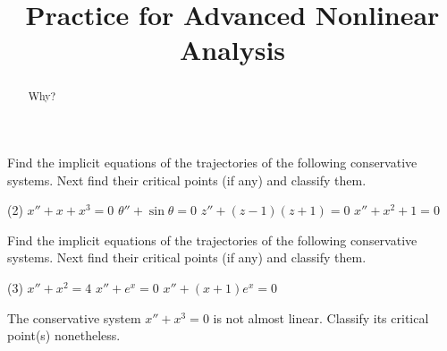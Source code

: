 \documentclass{ximera}
\title{Practice for Advanced Nonlinear Analysis}
\begin{document}
\begin{abstract}
Why?
\end{abstract}
\maketitle


\begin{exercise}
    Find the implicit equations of the trajectories of the following conservative systems.  Next find their critical points (if any) and classify them.
    \begin{tasks}(2)
        \task $x''+ x+x^3 = 0$
        \task $\theta''+\sin \theta = 0$
        \task $z''+ (z-1)(z+1) = 0$
        \task $x''+ x^2+1 = 0$
    \end{tasks}
\end{exercise}

\begin{exercise}%
    Find the implicit equations of the trajectories of the following conservative systems.  Next find their critical points (if any) and classify them.
    \begin{tasks}(3)
        \task $x''+ x^2 = 4$
        \task $x''+ e^x = 0$
        \task $x''+ (x+1)e^x = 0$
    \end{tasks}
\end{exercise}


\begin{exercise}%
    The conservative system $x''+x^3 = 0$ is not almost linear.  Classify its critical point(s) nonetheless.
\end{exercise}
\end{document}

